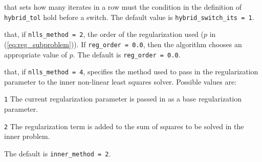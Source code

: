 \begin{description}
that sets how many iterates in a row must the condition in the definition of {\tt hybrid\_tol} hold before a switch.
The default value is {\tt hybrid\_switch\_its = 1}.

that, if {\tt nlls\_method = 2}, the order of the regularization used ($p$ in (\ref{eq:reg_subproblem})).  If {\tt reg\_order = 0.0}, then the algorithm
chooses an appropriate value of $p$. The default is {\tt reg\_order = 0.0}.

that, if {\tt nlls\_method = 4}, specifies the method used to pass in 
the regularization parameter to the inner non-linear least squares solver.  
Possible values are:
\begin{description}
  \item {\tt 1} The current regularization parameter is passed in as a base regularization parameter.
  \item {\tt 2} The regularization term is added to the sum of squares to be solved in the inner problem.
\end{description}
The default is {\tt inner\_method = 2}.


\end{description}


